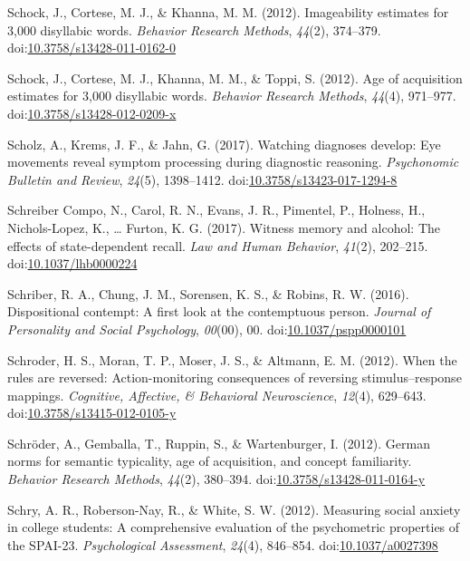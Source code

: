 \documentclass[english,man]{apa6}
\theoremstyle{definition}
\theoremstyle{definition}
\theoremstyle{definition}
\theoremstyle{remark}
\begin{document}
\hypertarget{ref-Schock2012}{}
Schock, J., Cortese, M. J., \& Khanna, M. M. (2012). Imageability
estimates for 3,000 disyllabic words. \emph{Behavior Research Methods},
\emph{44}(2), 374--379.
doi:\href{https://doi.org/10.3758/s13428-011-0162-0}{10.3758/s13428-011-0162-0}

\hypertarget{ref-Schock2012a}{}
Schock, J., Cortese, M. J., Khanna, M. M., \& Toppi, S. (2012). Age of
acquisition estimates for 3,000 disyllabic words. \emph{Behavior
Research Methods}, \emph{44}(4), 971--977.
doi:\href{https://doi.org/10.3758/s13428-012-0209-x}{10.3758/s13428-012-0209-x}

\hypertarget{ref-Scholz2017}{}
Scholz, A., Krems, J. F., \& Jahn, G. (2017). Watching diagnoses
develop: Eye movements reveal symptom processing during diagnostic
reasoning. \emph{Psychonomic Bulletin and Review}, \emph{24}(5),
1398--1412.
doi:\href{https://doi.org/10.3758/s13423-017-1294-8}{10.3758/s13423-017-1294-8}

\hypertarget{ref-SchreiberCompo2017}{}
Schreiber Compo, N., Carol, R. N., Evans, J. R., Pimentel, P., Holness,
H., Nichols-Lopez, K., \ldots{} Furton, K. G. (2017). Witness memory and
alcohol: The effects of state-dependent recall. \emph{Law and Human
Behavior}, \emph{41}(2), 202--215.
doi:\href{https://doi.org/10.1037/lhb0000224}{10.1037/lhb0000224}

\hypertarget{ref-Schriber2016}{}
Schriber, R. A., Chung, J. M., Sorensen, K. S., \& Robins, R. W. (2016).
Dispositional contempt: A first look at the contemptuous person.
\emph{Journal of Personality and Social Psychology}, \emph{00}(00), 00.
doi:\href{https://doi.org/10.1037/pspp0000101}{10.1037/pspp0000101}

\hypertarget{ref-Schroder2012}{}
Schroder, H. S., Moran, T. P., Moser, J. S., \& Altmann, E. M. (2012).
When the rules are reversed: Action-monitoring consequences of reversing
stimulus--response mappings. \emph{Cognitive, Affective, \& Behavioral
Neuroscience}, \emph{12}(4), 629--643.
doi:\href{https://doi.org/10.3758/s13415-012-0105-y}{10.3758/s13415-012-0105-y}

\hypertarget{ref-Schroder2012a}{}
Schröder, A., Gemballa, T., Ruppin, S., \& Wartenburger, I. (2012).
German norms for semantic typicality, age of acquisition, and concept
familiarity. \emph{Behavior Research Methods}, \emph{44}(2), 380--394.
doi:\href{https://doi.org/10.3758/s13428-011-0164-y}{10.3758/s13428-011-0164-y}

\hypertarget{ref-Schry2012}{}
Schry, A. R., Roberson-Nay, R., \& White, S. W. (2012). Measuring social
anxiety in college students: A comprehensive evaluation of the
psychometric properties of the SPAI-23. \emph{Psychological Assessment},
\emph{24}(4), 846--854.
doi:\href{https://doi.org/10.1037/a0027398}{10.1037/a0027398}
\end{document}
